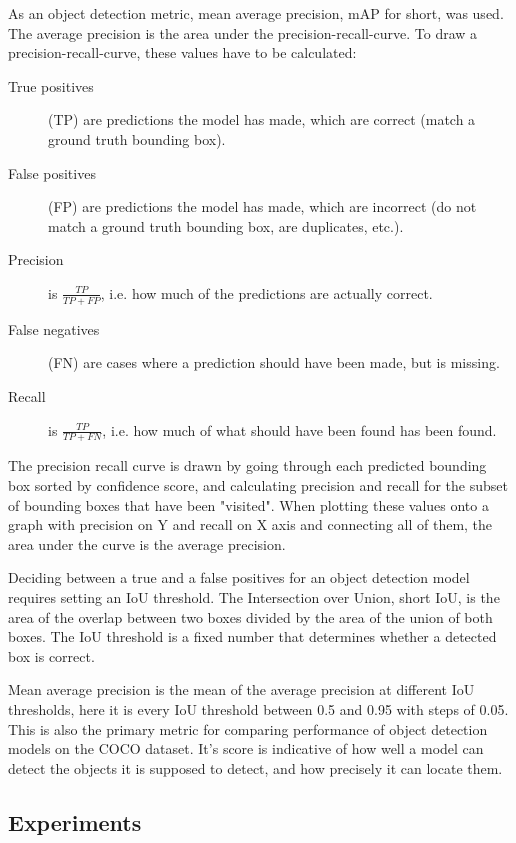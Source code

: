 As an object detection metric, mean average precision, mAP for short, was used. The average precision is the area under the precision-recall-curve. To draw a precision-recall-curve, these values have to be calculated:

\begin{description}
  \item[True positives] (TP) are predictions the model has made, which are correct (match a ground truth bounding box).
  \item[False positives] (FP) are predictions the model has made, which are incorrect (do not match a ground truth bounding box, are duplicates, etc.).
  \item[Precision] is $\frac{TP}{TP + FP}$, i.e. how much of the predictions are actually correct.
  \item[False negatives] (FN) are cases where a prediction should have been made, but is missing.
  \item[Recall] is $\frac{TP}{TP + FN}$, i.e. how much of what should have been found has been found.
\end{description}

The precision recall curve is drawn by going through each predicted bounding box sorted by confidence score, and calculating precision and recall for the subset of bounding boxes that have been "visited". When plotting these values onto a graph with precision on Y and recall on X axis and connecting all of them, the area under the curve is the average precision.

Deciding between a true and a false positives for an object detection model requires setting an IoU threshold. The Intersection over Union, short IoU, is the area of the overlap between two boxes divided by the area of the union of both boxes. The IoU threshold is a fixed number that determines whether a detected box is correct.

Mean average precision is the mean of the average precision at different IoU thresholds, here it is every IoU threshold between 0.5 and 0.95 with steps of 0.05. This is also the primary metric for comparing performance of object detection models on the COCO dataset. \cite{cocoevaluation} It's score is indicative of how well a model can detect the objects it is supposed to detect, and how precisely it can locate them.

\subsection*{Experiments}


